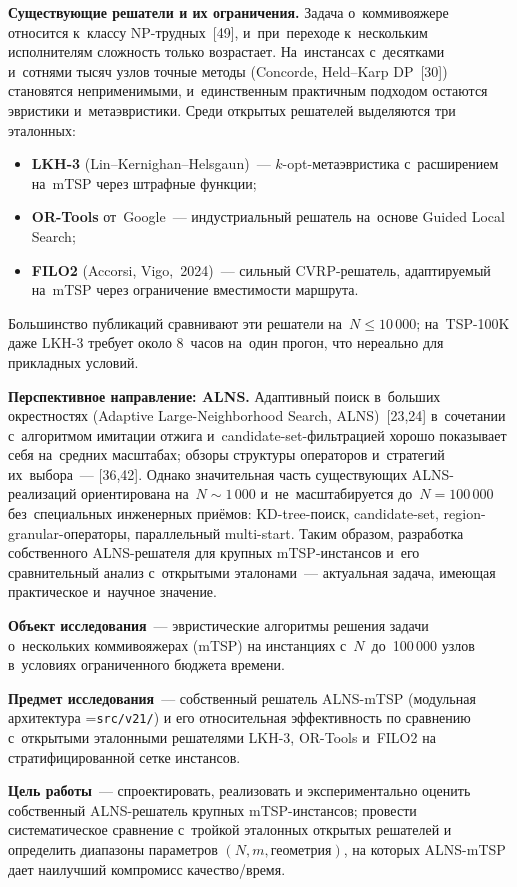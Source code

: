 \documentclass[a4paper,14pt]{extreport}
\makeatletter
\let\old@texttt\texttt
\renewcommand{\texttt}[1]{{\sloppy\hyphenchar\font=\m@ne\old@texttt{#1}}}
\makeatother
\begin{document}
\textbf{Существующие решатели и их ограничения.} Задача о~коммивояжере относится к~классу NP-трудных~[49], и~при~переходе к~нескольким исполнителям сложность только возрастает. На~инстансах с~десятками и~сотнями тысяч узлов точные методы (Concorde, Held--Karp DP~[30]) становятся неприменимыми, и~единственным практичным подходом остаются эвристики и~метаэвристики. Среди открытых решателей выделяются три эталонных:
\begin{itemize}\setlength\itemsep{1pt}
\item \textbf{LKH-3} (Lin--Kernighan--Helsgaun)~--- $k$-opt-метаэвристика с~расширением на~mTSP через штрафные функции;
\item \textbf{OR-Tools} от~Google~--- индустриальный решатель на~основе Guided Local Search;
\item \textbf{FILO2} (Accorsi, Vigo,~2024)~--- сильный CVRP-решатель, адаптируемый на~mTSP через ограничение вместимости маршрута.
\end{itemize}
Большинство публикаций сравнивают эти решатели на~$N \leq 10\,000$; на~TSP-100K даже LKH-3 требует около 8~часов на~один прогон, что нереально для прикладных условий.

\textbf{Перспективное направление: ALNS.} Адаптивный поиск в~больших окрестностях (Adaptive Large-Neighborhood Search, ALNS)~[23,24] в~сочетании с~алгоритмом имитации отжига и~candidate-set-фильтрацией хорошо показывает себя на~средних масштабах; обзоры структуры операторов и~стратегий их~выбора~--- [36,42]. Однако значительная часть существующих ALNS-реализаций ориентирована на~$N\sim 1\,000$ и~не~масштабируется до~$N=100\,000$ без~специальных инженерных приёмов: KD-tree-поиск, candidate-set, region-granular-операторы, параллельный multi-start. Таким образом, разработка собственного ALNS-решателя для крупных mTSP-инстансов и~его сравнительный анализ с~открытыми эталонами~--- актуальная задача, имеющая практическое и~научное значение.

\medskip
\textbf{Объект исследования}~--- эвристические алгоритмы решения задачи о~нескольких коммивояжерах (mTSP) на инстанциях с~$N$~до~100\,000 узлов в~условиях ограниченного бюджета времени.

\textbf{Предмет исследования}~--- собственный решатель ALNS-mTSP (модульная архитектура \texttt{src/v21/}) и его относительная эффективность по сравнению с~открытыми эталонными решателями LKH-3, OR-Tools и~FILO2 на стратифицированной сетке инстансов.

\textbf{Цель работы}~--- спроектировать, реализовать и экспериментально оценить собственный ALNS-решатель крупных mTSP-инстансов; провести систематическое сравнение с~тройкой эталонных открытых решателей и определить диапазоны параметров $(N,m,\text{геометрия})$, на которых ALNS-mTSP дает наилучший компромисс качество/время.
\end{document}
